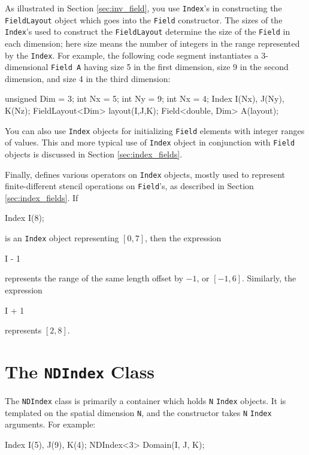As illustrated in Section \ref{sec:inv_field}, you use \texttt{Index}'s in constructing the \texttt{FieldLayout} object which goes into the \texttt{Field} constructor. The sizes of the \texttt{Index}'s used to construct the \texttt{FieldLayout} determine the size of the \texttt{Field} in each dimension; here size means the number of integers in the range represented by the \texttt{Index}. For example, the following code segment instantiates a 3-dimensional \texttt{Field A} having size 5 in the first dimension, size 9 in the second dimension, and size 4 in the
third dimension: \\
\begin{code}
unsigned Dim = 3;
int Nx = 5;
int Ny = 9;
int Nx = 4;
Index I(Nx), J(Ny), K(Nz);
FieldLayout<Dim> layout(I,J,K);
Field<double, Dim> A(layout);
\end{code}

You can also use \texttt{Index} objects for initializing \texttt{Field} elements with integer ranges of values. This and more typical use of \texttt{Index} object in conjunction with \texttt{Field} objects is discussed in Section \ref{sec:index_fields}.

Finally, \ippl defines various operators on \texttt{Index} objects, mostly used to represent finite-different stencil operations on \texttt{Field}'s, as described in Section \ref{sec:index_fields}. If
\begin{smallcode}
Index I(8);
\end{smallcode}
is an \texttt{Index} object representing $[0,7]$, then the expression
\begin{smallcode}
I - 1
\end{smallcode}
represents the range of the same length offset by $-1$, or $[-1,6]$. Similarly, the expression
\begin{smallcode}
I + 1
\end{smallcode}
represents $[2,8]$.

\section{The \texttt{NDIndex} Class}

The \texttt{NDIndex} class is primarily a container which holds \texttt{N} \texttt{Index} objects. It is templated on the spatial dimension \texttt{N}, and the constructor takes \texttt{N} \texttt{Index} arguments. For example:
\begin{smallcode}
Index I(5), J(9), K(4);
NDIndex<3> Domain(I, J, K);
\end{smallcode}

